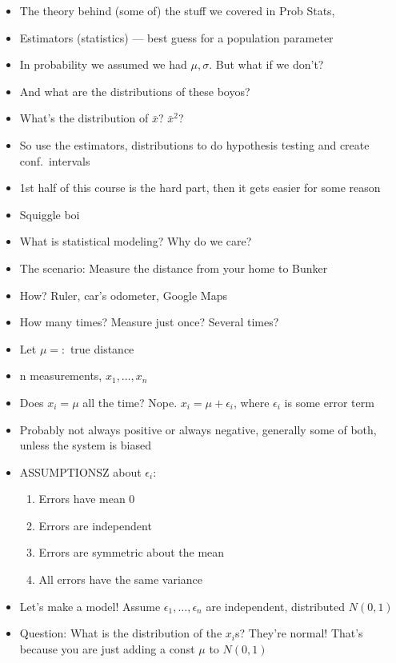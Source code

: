 \documentclass{article}
\begin{document}
  \begin{itemize}
    \item The theory behind (some of) the stuff we covered in Prob Stats,
    \item Estimators (statistics) --- best guess for a population parameter
    \item In probability we assumed we had $ \mu, \sigma $. But what if we don't?
    \item And what are the distributions of these boyos?
    \item What's the distribution of $ \bar{x} $? $ \bar{x}^2 $?
    \item So use the estimators, distributions to do hypothesis testing and create conf.~intervals
    \item 1st half of this course is the hard part, then it gets easier for some reason
    \item Squiggle boi
    \item What is statistical modeling? Why do we care?
    \item The scenario: Measure the distance from your home to Bunker
    \item How? Ruler, car's odometer, Google Maps
    \item How many times? Measure just once? Several times?
    \item Let  $ \mu =: $ true distance
    \item n measurements,  $ x_1, \ldots, x_n $
    \item Does $ x_i = \mu $ all the time? Nope. $ x_i = \mu + \epsilon_i $, where $ \epsilon_i $ is some error term
    \item Probably not always positive or always negative, generally some of both, unless the system is biased
    \item ASSUMPTIONSZ about $ \epsilon_i $:
       \begin{enumerate}
         \item Errors have mean 0
         \item Errors are independent
         \item Errors are symmetric about the mean
         \item All errors have the same variance
      \end{enumerate}
    \item Let's make a model! Assume $ \epsilon_1, \ldots, \epsilon_n $ are independent, distributed $ N(0, 1) $
    \item Question\@: What is the distribution of the  $ x_i $s? They're normal! That's because you are just adding a const $ \mu $ to  $ N(0, 1) $

\end{itemize}
\end{document}
